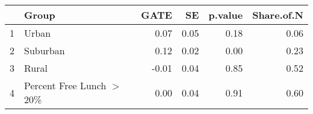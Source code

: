 \begin{tabular}{rlrrrr}
  \hline
 & Group & GATE & SE & p.value & Share.of.N \\ 
  \hline
1 & Urban & 0.07 & 0.05 & 0.18 & 0.06 \\ 
  2 & Suburban & 0.12 & 0.02 & 0.00 & 0.23 \\ 
  3 & Rural & -0.01 & 0.04 & 0.85 & 0.52 \\ 
  4 & Percent Free Lunch $>$ 20\% & 0.00 & 0.04 & 0.91 & 0.60 \\ 
   \hline
\end{tabular}
